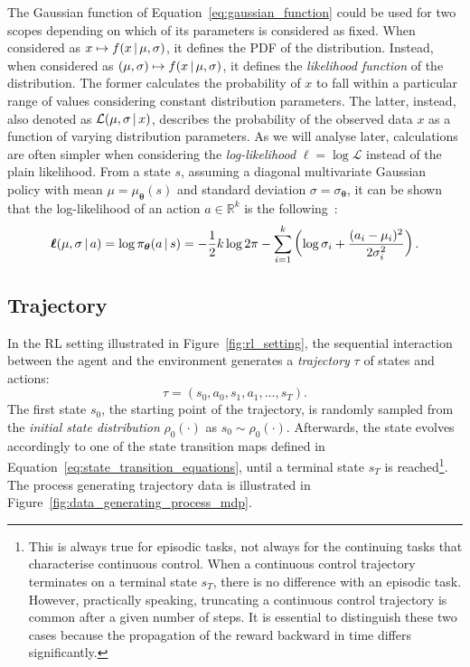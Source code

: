 \begin{remark*}
%
The Gaussian function of Equation~\eqref{eq:gaussian_function} could be used for two scopes depending on which of its parameters is considered as fixed.
When considered as $x \mapsto f(x \operatorname{\mid} \mu, \sigma)$, it defines the \ac{PDF} of the distribution.
Instead, when considered as $(\mu, \sigma) \mapsto f(x \operatorname{\mid} \mu, \sigma)$, it defines the \emph{likelihood function} of the distribution.
The former calculates the probability of $x$ to fall within a particular range of values considering constant distribution parameters.
The latter, instead, also denoted as $\mathcal{L}(\mu, \sigma \operatorname{\mid} x)$, describes the probability of the observed data $x$ as a function of varying distribution parameters.
As we will analyse later, calculations are often simpler when considering the \emph{log-likelihood} $\boldsymbol{\ell} = \log{\mathcal{L}}$ instead of the plain likelihood.
From a state $s$, assuming a diagonal multivariate Gaussian policy with mean $\mu = \mu_{\boldsymbol{\theta}}(s)$ and standard deviation $\sigma = \sigma_{\boldsymbol{\theta}}$, it can be shown that the log-likelihood of an action $a \in \mathbb{R}^k$ is the following~\parencite{bishop_pattern_2006}:
%
\begin{equation}
    \boldsymbol{\ell}(\mu, \sigma \operatorname{\mid} a) =
    \log\pi_{\boldsymbol{\theta}}(a \operatorname{\mid} s) =
    -\frac{1}{2} k \log{2\pi} - \sum_{i=1}^{k} \left( \log{\sigma_i} + \frac{(a_i - \mu_i)^2}{2 \sigma_i^2} \right).
\end{equation}
%
\end{remark*}

\subsection{Trajectory}

In the \ac{RL} setting illustrated in Figure~\ref{fig:rl_setting}, 
the sequential interaction between the agent and the environment generates a \emph{trajectory} $\tau$ of states and actions:
%
\begin{equation*}
    \tau = (s_0, a_0, s_1, a_1, \dots, s_T).
\end{equation*}
%
The first state $s_0$, \ie the starting point of the trajectory, is randomly sampled from the \emph{initial state distribution} $\rho_0(\cdot)$ as $s_0 \sim \rho_0(\cdot)$.
Afterwards, the state evolves accordingly to one of the state transition maps defined in Equation~\eqref{eq:state_transition_equations}, until a terminal state $s_T$ is reached\footnote{This is always true for episodic tasks, not always for the continuing tasks that characterise continuous control.
When a continuous control trajectory terminates on a terminal state $s_T$, there is no difference with an episodic task.
However, practically speaking, truncating a continuous control trajectory is common after a given number of steps.
It is essential to distinguish these two cases because the propagation of the reward backward in time differs significantly.}.
The process generating trajectory data is illustrated in Figure~\ref{fig:data_generating_process_mdp}.

